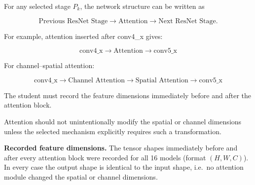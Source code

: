 \documentclass[10pt]{article}
\begin{document}
For any selected stage $P_k$, the network structure can be written as

\[
\text{Previous ResNet Stage}
\rightarrow
\text{Attention}
\rightarrow
\text{Next ResNet Stage}.
\]

For example, attention inserted after conv4\_x gives:

\[
\boxed{
\text{conv4\_x}
\rightarrow
\text{Attention}
\rightarrow
\text{conv5\_x}
}
\]

For channel--spatial attention:

\[
\boxed{
\text{conv4\_x}
\rightarrow
\text{Channel Attention}
\rightarrow
\text{Spatial Attention}
\rightarrow
\text{conv5\_x}
}
\]

The student must record the feature dimensions immediately before and after
the attention block.

Attention should not unintentionally modify the spatial or channel
dimensions unless the selected mechanism explicitly requires such a
transformation.


\textbf{Recorded feature dimensions.} The tensor shapes immediately before and after every attention
block were recorded for all 16 models (format $(H,W,C)$). In every case the output shape is identical to
the input shape, i.e.\ no attention module changed the spatial or channel dimensions.
\end{document}
